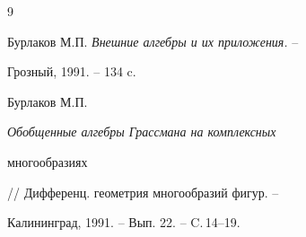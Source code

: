\begin{thebibliography}{9}







Бурлаков М.П. {\em Внешние алгебры и их приложения.} --


Грозный, 1991. -- 134 c. 




Бурлаков М.П. {\em Обобщенные алгебры Грассмана на комплексных


многообразиях} // Дифференц. геометрия многообразий фигур. --


Калининград, 1991. -- Вып. 22. -- C.\,14--19.





\end{thebibliography}





\vskip 2cm












\label{end}








